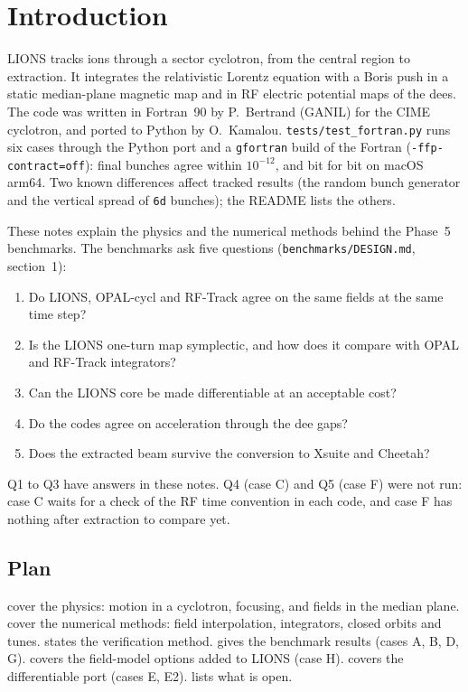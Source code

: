 \chapter{Introduction}\label{ch:intro}

LIONS tracks ions through a sector cyclotron, from the central region to extraction.
It integrates the relativistic Lorentz equation with a Boris push in a static median-plane magnetic map and in RF
electric potential maps of the dees.
The code was written in Fortran~90 by P.~Bertrand (GANIL) for the CIME cyclotron, and ported to Python by
O.~Kamalou.
\nolinkurl{tests/test_fortran.py} runs six cases through the Python port and a \texttt{gfortran} build of the Fortran
(\texttt{-ffp-contract=off}): final bunches agree within $10^{-12}$, and bit for bit on macOS arm64.
Two known differences affect tracked results (the random bunch generator and the vertical spread of \texttt{6d}
bunches); the README lists the others.

These notes explain the physics and the numerical methods behind the Phase~5 benchmarks.
The benchmarks ask five questions (\nolinkurl{benchmarks/DESIGN.md}, section~1):
\begin{enumerate}
\item[Q1] Do LIONS, OPAL-cycl and RF-Track agree on the same fields at the same time step?
\item[Q2] Is the LIONS one-turn map symplectic, and how does it compare with OPAL and RF-Track integrators?
\item[Q3] Can the LIONS core be made differentiable at an acceptable cost?
\item[Q4] Do the codes agree on acceleration through the dee gaps?
\item[Q5] Does the extracted beam survive the conversion to Xsuite and Cheetah?
\end{enumerate}
Q1 to Q3 have answers in these notes.
Q4 (case C) and Q5 (case F) were not run: case C waits for a check of the RF time convention in each code, and case F
has nothing after extraction to compare yet.

\section*{Plan}
 cover the physics: motion in a cyclotron, focusing, and fields in the median plane.
 cover the numerical methods: field interpolation, integrators, closed
orbits and tunes.
 states the verification method.
 gives the benchmark results (cases A, B, D, G).
 covers the field-model options added to LIONS (case H).
 covers the differentiable port (cases E, E2).
 lists what is open.


